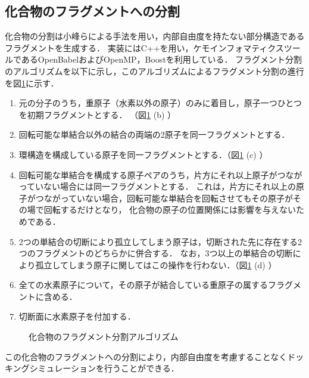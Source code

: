 \subsection{化合物のフラグメントへの分割}\label{subsec:decomposition}
化合物の分割は小峰らによる手法\cite{Shunta2015}を用い，内部自由度を持たない部分構造であるフラグメントを生成する．
実装にはC++を用い，ケモインフォマティクスツールであるOpenBabel\cite{OBoyle2011}およびOpenMP，Boostを利用している．
フラグメント分割のアルゴリズムを以下に示し，このアルゴリズムによるフラグメント分割の進行を図\ref{fig:decomposition}に示す．
\begin{enumerate} 
\item 元の分子のうち，重原子（水素以外の原子）のみに着目し，原子一つひとつを初期フラグメントとする．
	（図\ref{fig:decomposition} (b) ）
\item 回転可能な単結合以外の結合の両端の2原子を同一フラグメントとする．
\item 環構造を構成している原子を同一フラグメントとする．（図\ref{fig:decomposition} (c) ）
\item 回転可能な単結合を構成する原子ペアのうち，片方にそれ以上原子がつながっていない場合には同一フラグメントとする．
	これは，片方にそれ以上の原子がつながっていない場合，回転可能な単結合を回転させてもその原子がその場で回転するだけとなり，
	化合物の原子の位置関係には影響を与えないためである．
\item 2つの単結合の切断により孤立してしまう原子は，切断された先に存在する2つのフラグメントのどちらかに併合する．
	なお，3つ以上の単結合の切断により孤立してしまう原子に関してはこの操作を行わない．（図\ref{fig:decomposition} (d) ）
\item 全ての水素原子について，その原子が結合している重原子の属するフラグメントに含める．
\item 切断面に水素原子を付加する．
\end{enumerate}
\begin{figure}[htp]
 \begin{center}
  \caption{化合物のフラグメント分割アルゴリズム}
  \label{fig:decomposition}
 \end{center}
\end{figure}
この化合物のフラグメントへの分割により，内部自由度を考慮することなくドッキングシミュレーションを行うことができる．

